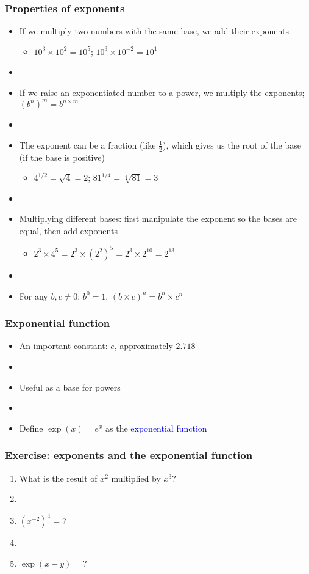 \documentclass[11pt]{beamer}
\newcommand{\myframe}[1]{\begin{frame} \frametitle{#1}}
\begin{document}
\myframe{Properties of exponents}
\fontsize{9pt}{7.2}\selectfont
\begin{itemize}
\item If we multiply two numbers with the same base, we add their exponents
\begin{itemize}
\item $10^3 \times 10^2 = 10^5$; $10^3 \times 10^{-2} = 10^1$
\end{itemize}
\item[]
\item If we raise an exponentiated number to a power, we multiply the exponents; $(b^n)^m = b^{n\times m}$
\item[]
\item The exponent can be a fraction (like $\frac{1}{2}$), which gives us the root of the base (if the base is positive)
\begin{itemize}
\item $4^{1/2} = \sqrt{4} = 2$; $81^{1/4} = \sqrt[4]{81} = 3$
\end{itemize}
\item[]
\item Multiplying different bases: first manipulate the exponent so the bases are equal, then add exponents
\begin{itemize}
\item $2^3 \times 4^5 = 2^3 \times (2^2)^5 = 2^3 \times 2^{10} = 2^{13}$
\end{itemize}
\item[]
\item For any $b, c \neq 0$: $b^0 = 1$, $(b \times c)^n = b^n \times c^n$
\end{itemize}
\end{frame}

\myframe{Exponential function}
\begin{itemize}
\item An important constant: $e$, approximately $2.718$
\item[]
\item Useful as a base for powers
\item[]
\item Define $\exp(x) = e^x$ as the \textcolor{blue}{exponential function}
\end{itemize}
\end{frame}

\myframe{Exercise: exponents and the exponential function}
\begin{enumerate}
\item What is the result of $x^2$ multiplied by $x^3$?
\item[]
\item $(x^{-2})^4 = $?
\item[]
\item $\exp(x - y) = $?
\end{enumerate}
\end{frame}
\end{document}
